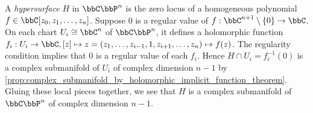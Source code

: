     \begin{example}\label{eg:hypersurface_in_CPn_as_complex_manifold}
        A \emph{hypersurface} \(H\) in \(\bbC\bbP^n\) is the zero locus of a homogeneous polynomial \(f \in \bbC[z_0, z_1, \ldots, z_n]\).
        Suppose \(0\) is a regular value of \(f: \bbC^{n+1}\setminus \{0\} \to \bbC\).
        On each chart \(U_i \cong \bbC^n\) of \(\bbC\bbP^n\), it defines a holomorphic function \(f_i: U_i \to \bbC, [z] \mapsto z = (z_1, \ldots, z_{i-1}, 1, z_{i+1}, \ldots, z_n) \mapsto f(z)\).
        The regularity condition implies that \(0\) is a regular value of each \(f_i\).
        Hence \(H \cap U_i = f_i^{-1}(0)\) is a complex submanifold of \(U_i\) of complex dimension \(n-1\) by \cref{prop:complex_submanifold_by_holomorphic_implicit_function_theorem}.
        Gluing these local pieces together, we see that \(H\) is a complex submanifold of \(\bbC\bbP^n\) of complex dimension \(n-1\).
    \end{example}

